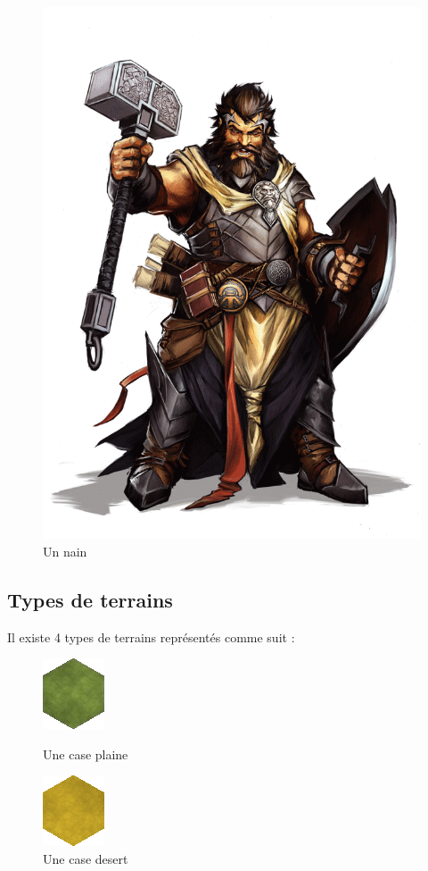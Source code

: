\begin{figure}[ht!]
\centering
\includegraphics[scale=0.10]{img/dwarf.png}
\caption{Un nain}
\end{figure}

\subsection{Types de terrains}
Il existe 4 types de terrains représentés comme suit :

\begin{figure}[ht]
\begin{minipage}[b]{0.45\linewidth}
\centering
\includegraphics[scale=1]{img/plaine.png}
\caption{Une case plaine}
\label{fig:figure1}
\end{minipage}
\hspace{0.5cm}
\begin{minipage}[b]{0.45\linewidth}
\centering
\includegraphics[scale=1]{img/desert.png}
\caption{Une case desert}
\label{fig:figure2}
\end{minipage}
\end{figure}

